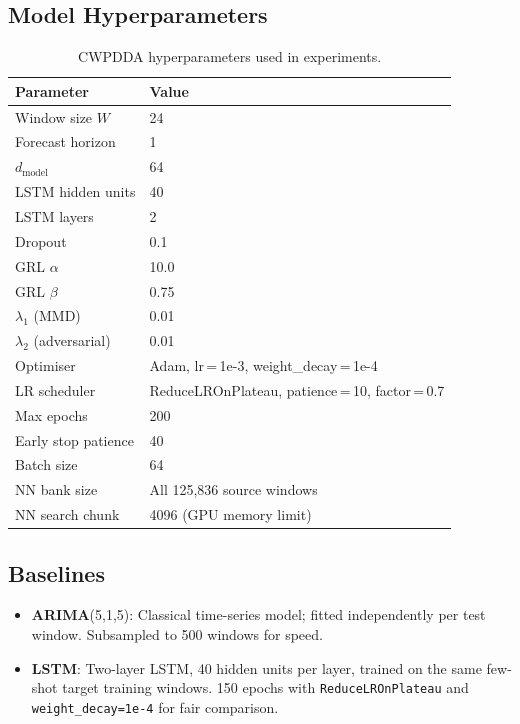 \documentclass[12pt,a4paper]{article}
\begin{document}
\subsection{Model Hyperparameters}

\begin{table}[H]
\centering
\caption{CWPDDA hyperparameters used in experiments.}
\label{tab:hyperparams}
\begin{tabular}{@{}ll@{}}
\toprule
\textbf{Parameter} & \textbf{Value} \\
\midrule
Window size $W$ & 24 \\
Forecast horizon & 1 \\
$d_{\text{model}}$ & 64 \\
LSTM hidden units & 40 \\
LSTM layers & 2 \\
Dropout & 0.1 \\
GRL $\alpha$ & 10.0 \\
GRL $\beta$ & 0.75 \\
$\lambda_1$ (MMD) & 0.01 \\
$\lambda_2$ (adversarial) & 0.01 \\
Optimiser & Adam, lr\,=\,1e-3, weight\_decay\,=\,1e-4 \\
LR scheduler & ReduceLROnPlateau, patience\,=\,10, factor\,=\,0.7 \\
Max epochs & 200 \\
Early stop patience & 40 \\
Batch size & 64 \\
NN bank size & All 125,836 source windows \\
NN search chunk & 4096 (GPU memory limit) \\
\bottomrule
\end{tabular}
\end{table}

\subsection{Baselines}

\begin{itemize}
    \item \textbf{ARIMA}(5,1,5): Classical time-series model; fitted independently
    per test window.  Subsampled to 500 windows for speed.
    \item \textbf{LSTM}: Two-layer LSTM, 40 hidden units per layer, trained on the
    same few-shot target training windows.  150 epochs with
    \texttt{ReduceLROnPlateau} and \texttt{weight\_decay=1e-4} for fair comparison.
\end{itemize}
\end{document}
